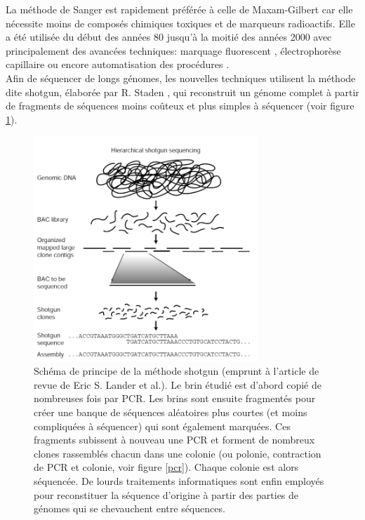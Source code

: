  
 La méthode de Sanger est rapidement préférée à celle de Maxam-Gilbert car elle nécessite moins de composés chimiques toxiques et de marqueurs radioactifs. Elle a été utilisée du début des années 80 jusqu'à la moitié des années 2000 avec principalement des avancées techniques:  marquage fluorescent \cite{Prober1987}, électrophorèse capillaire \cite{Swerdlow1991} ou encore automatisation des procédures \cite{Hunkapiller1991}.\\
 
  Afin de séquencer de longs génomes, les nouvelles techniques utilisent la méthode dite shotgun, élaborée par R. Staden \cite{Staden1979}, qui reconstruit un génome complet à partir de fragments de séquences moins coûteux et plus simples à séquencer (voir figure \ref{shotgun}).
 


\begin{figure}[H]
\begin{center}
\includegraphics[width=0.75\textwidth]{shotgun.jpeg}
\vspace{0.5cm}

\caption[Méthode Shotgun]{Schéma de principe de la méthode shotgun (emprunt à l'article de revue de Eric S. Lander et al.\cite{Lander2001}). Le brin étudié est d'abord copié de nombreuses fois par PCR. Les brins sont ensuite fragmentés pour créer une banque de séquences aléatoires plus courtes (et moins compliquées à séquencer) qui sont également marquées. Ces fragments subissent à nouveau une PCR et forment de nombreux clones rassemblés chacun dans une colonie (ou polonie, contraction de PCR et colonie, voir figure \ref{pcr}). Chaque colonie est alors séquencée. De lourds traitements informatiques sont enfin employés pour reconstituer la séquence d'origine à partir des parties de génomes qui se chevauchent entre séquences.}
\label{shotgun}
\end{center}
\end{figure}

